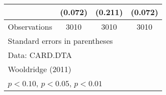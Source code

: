 \begin{table}[htbp]
\begin{tabular}{l*{3}{c}}
                    &     (0.072)         &     (0.211)         &     (0.072)         \\
\midrule
Observations        &        3010         &        3010         &        3010         \\
\bottomrule
\multicolumn{4}{l}{\footnotesize Standard errors in parentheses}\\
\multicolumn{4}{l}{\footnotesize Data: CARD.DTA}\\
\multicolumn{4}{l}{\footnotesize Wooldridge (2011)}\\
\multicolumn{4}{l}{\footnotesize \sym{*} \(p<0.10\), \sym{**} \(p<0.05\), \sym{***} \(p<0.01\)}\\
\end{tabular}
\end{table}
